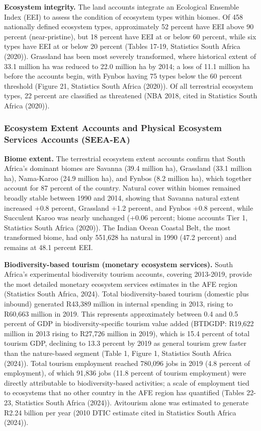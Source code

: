 \documentclass[
  letterpaper,
  DIV=11,
  numbers=noendperiod]{scrartcl}
\begin{document}
\textbf{Ecosystem integrity.} The land accounts integrate an Ecological
Ensemble Index (EEI) to assess the condition of ecosystem types within
biomes. Of 458 nationally defined ecosystem types, approximately 52
percent have EEI above 90 percent (near-pristine), but 18 percent have
EEI at or below 60 percent, while six types have EEI at or below 20
percent (Tables 17-19, Statistics South Africa (2020)). Grassland has
been most severely transformed, where historical extent of 33.1 million
ha was reduced to 22.0 million ha by 2014; a loss of 11.1 million ha
before the accounts begin, with Fynbos having 75 types below the 60
percent threshold (Figure 21, Statistics South Africa (2020)). Of all
terrestrial ecosystem types, 22 percent are classified as threatened
(NBA 2018, cited in Statistics South Africa (2020)).

\subsubsection{Ecosystem Extent Accounts and Physical Ecosystem Services
Accounts
(SEEA-EA)}\label{ecosystem-extent-accounts-and-physical-ecosystem-services-accounts-seea-ea}

\textbf{Biome extent.} The terrestrial ecosystem extent accounts confirm
that South Africa's dominant biomes are Savanna (39.4 million ha),
Grassland (33.1 million ha), Nama-Karoo (24.9 million ha), and Fynbos
(8.2 million ha), which together account for 87 percent of the country.
Natural cover within biomes remained broadly stable between 1990 and
2014, showing that Savanna natural extent increased +0.8 percent,
Grassland +1.2 percent, and Fynbos +0.8 percent, while Succulent Karoo
was nearly unchanged (+0.06 percent; biome accounts Tier 1, Statistics
South Africa (2020)). The Indian Ocean Coastal Belt, the most
transformed biome, had only 551,628 ha natural in 1990 (47.2 percent)
and remains at 48.1 percent EEI.

\textbf{Biodiversity-based tourism (monetary ecosystem services).} South
Africa's experimental biodiversity tourism accounts, covering 2013-2019,
provide the most detailed monetary ecosystem services estimates in the
AFE region (Statistics South Africa, 2024). Total biodiversity-based
tourism (domestic plus inbound) generated R43,389 million in internal
spending in 2013, rising to R60,663 million in 2019. This represents
approximately between 0.4 and 0.5 percent of GDP in
biodiversity-specific tourism value added (BTDGDP: R19,622 million in
2013 rising to R27,726 million in 2019), which is 15.4 percent of total
tourism GDP, declining to 13.3 percent by 2019 as general tourism grew
faster than the nature-based segment (Table 1, Figure 1, Statistics
South Africa (2024)). Total tourism employment reached 780,096 jobs in
2019 (4.8 percent of employment), of which 91,836 jobs (11.8 percent of
tourism employment) were directly attributable to biodiversity-based
activities; a scale of employment tied to ecosystems that no other
country in the AFE region has quantified (Tables 22-23, Statistics South
Africa (2024)). Avitourism alone was estimated to generate R2.24 billion
per year (2010 DTIC estimate cited in Statistics South Africa (2024)).
\end{document}
